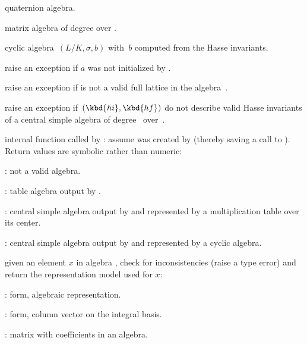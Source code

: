 quaternion algebra.

matrix algebra of degree  over .

cyclic algebra~$(L/K,\sigma,b)$ with~$b$ computed from the Hasse invariants.


 raise an exception if $a$ was not initialized
by .

 raise an exception if  is not a
valid full lattice in the algebra~.

 raise an exception
if~$(\kbd{hi},\kbd{hf})$ do not describe valid Hasse invariants of a central
simple algebra of degree~ over~.

 internal function called by : assume
 was created by  (thereby saving a call to ).
Return values are symbolic rather than numeric:

\item {}: not a valid algebra.

\item {}: table algebra output by .

\item {}: central simple algebra output by  and
represented by a multiplication table over its center.

\item {}: central  simple  algebra  output  by  and
represented by a cyclic algebra.

 given an element $x$ in algebra ,
check for inconsistencies (raise a type error) and return the representation
model used for $x$:

\item {}:  form, algebraic representation.

\item {}:  form, column vector on the integral
basis.

\item {}: matrix with coefficients in an algebra.


